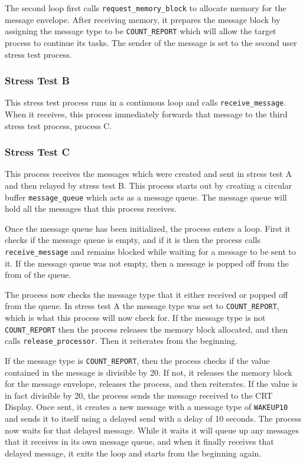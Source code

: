 \documentclass[se]{uw-wkrpt}
\begin{document}
The second loop first calls \texttt{request\_memory\_block} to allocate memory for the message envelope. After receiving memory, it prepares the message block by assigning the message type to be \texttt{COUNT\_REPORT} which will allow the target process to continue its tasks. The sender of the message is set to the second user stress test process.


\subsubsection{Stress Test B}

This stress test process runs in a continuous loop and calls \texttt{receive\_message}. When it receives, this process immediately forwards that message to the third stress test process, process C.


\subsubsection{Stress Test C}

This process receives the messages which were created and sent in stress test A and then relayed by stress test B. This process starts out by creating a circular buffer \texttt{message\_queue} which acts as a message queue. The message queue will hold all the messages that this process receives.

Once the message queue has been initialized, the process enters a loop. First it checks if the message queue is empty, and if it is then the process calls \texttt{receive\_message} and remains blocked while waiting for a message to be sent to it. If the message queue was not empty, then a message is popped off from the from of the queue.

The process now checks the message type that it either received or popped off from the queue. In stress test A the message type was set to \texttt{COUNT\_REPORT}, which is what this process will now check for. If the message type is not \texttt{COUNT\_REPORT} then the process releases the memory block allocated, and then calls \texttt{release\_processor}. Then it reiterates from the beginning.

If the message type is \texttt{COUNT\_REPORT}, then the process checks if the value contained in the message is divisible by 20. If not, it releases the memory block for the message envelope, releases the process, and then reiterates. If the value is in fact divisible by 20, the process sends the message received to the CRT Display. Once sent, it creates a new message with a message type of \texttt{WAKEUP10} and sends it to itself using a delayed send with a delay of 10 seconds. The process now waits for that delayed message. While it waits it will queue up any messages that it receives in its own message queue, and when it finally receives that delayed message, it exits the loop and starts from the beginning again. 
\end{document}
